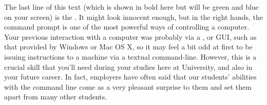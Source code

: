 %

The last line of this text (which is shown in bold here but will be green and blue on your screen) is the . It might look innocent enough, but in the right hands, the command prompt is one of the most powerful ways of controlling a computer. Your previous interaction with a computer was probably via  a , or GUI, such as that provided by Windows or Mac OS X, so  it may feel a bit odd at first to be issuing instructions to a machine via a textual command-line. However, this is a crucial skill that you'll need during your studies here at University, and also in your future career. In fact, employers have often said that our students' abilities with the command line come as a very pleasant surprise to them and set them apart from many other students.


